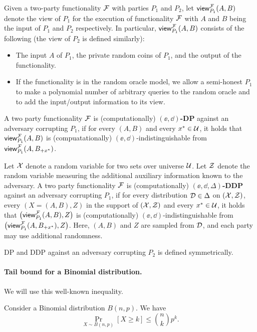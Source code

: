 \begin{definition}
Given a two-party functionality $\mathcal{F}$ with parties $P_1$ and $P_2$, let $\mathsf{view}_{P_1}^{\mathcal{F}}(A, B)$ denote the view of $P_1$ for the execution of functionality $\mathcal{F}$ with $A$ and $B$ being the input of $P_1$ and $P_2$ respectively. In particular, $\mathsf{view}_{P_1}^{\mathcal{F}}(A, B)$ consists of the following (the view of $P_2$ is defined similarly): 
\begin{itemize}
    \item The input $A$ of $P_1$,
    the private random coins of $P_1$, and the output of the functionality.
    \item If the functionality is in the random oracle model,
    we allow a semi-honest $P_1$ to make a polynomial number of arbitrary queries
    to the random oracle and to add the input/output information to its view.
\end{itemize} 
\end{definition}

\begin{definition}
A two party functionality $\mathcal{F}$ is (computationally) \textbf{$(\ee,\dd)$-DP}
against an adversary corrupting $P_1$, if for every $(A, B)$ and every $x^* \in
\mathcal{U}$, it holds that $\mathsf{view}^{\mathcal{F}}_{P_1}(A, B)$ is (compuatationally)
$(\ee,\dd)$-indistinguishable from $\mathsf{view}^{\mathcal{F}}_{P_1}(A, B_{+x^*})$.


Let $\mathcal{X}$ denote a random variable for two sets over universe $\mathcal{U}$.
Let $\mathcal{Z}$ denote the random variable measuring the additional auxiliary information known to the adversary.
A two party functionality $\mathcal{F}$ is (computationally) \textbf{$(\ee,\dd,\Delta)$-DDP} against an adversary corrupting $P_1$, if for every distribution ${\cal D} \in \Delta$ on $(\mathcal{X},\mathcal{Z})$, every $(X = (A, B), Z)$ in the support of $(\mathcal{X}, \mathcal{Z})$ and every $x^* \in \mathcal{U}$, it holds that
$\big(\mathsf{view}^{\mathcal{F}}_{P_1}(A, B), Z\big)$ is (computationally) $(\ee,\dd)$-indistinguishable from $\big(\mathsf{view}^{\mathcal{F}}_{P_1}(A, B_{+x^*}), Z\big)$.
Here, $(A, B)$ and $Z$ are sampled from ${\cal D}$, and each party may use additional randomness. 

DP and  DDP against an adversary corrupting $P_2$ is defined symmetrically. 
\end{definition}
%

\paragraph{Tail bound for a Binomial distribution.} We will use this well-known inequality. 
\begin{lemma}[\cite{D18}] \label{lem:bin}
Consider a Binomial distribution $B(n,p)$. We have 
\[ \Pr_{X \sim B(n,p)}[X \ge k] \le \binom{n}{k}  p^k. \]
\end{lemma}

